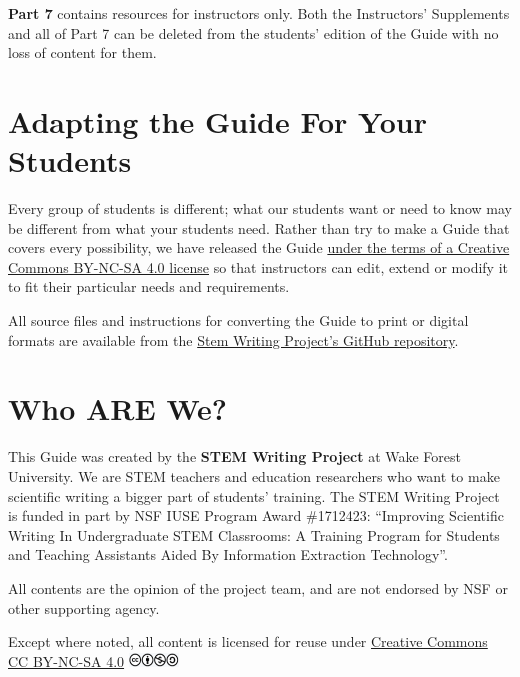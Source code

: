 \documentclass[
]{book}
\begin{document}
\textbf{Part 7} contains resources for instructors only. Both the Instructors' Supplements and all of Part 7 can be deleted from the students' edition of the Guide with no loss of content for them.

\hypertarget{adapting-the-guide-for-your-students}{%
\section*{Adapting the Guide For Your Students}\label{adapting-the-guide-for-your-students}}

Every group of students is different; what our students want or need to know may be different from what your students need. Rather than try to make a Guide that covers every possibility, we have released the Guide \href{http://creativecommons.org/licenses/by-nc-sa/4.0/}{under the terms of a Creative Commons BY-NC-SA 4.0 license} so that instructors can edit, extend or modify it to fit their particular needs and requirements.

All source files and instructions for converting the Guide to print or digital formats are available from the \href{https://github.com/adanieljohnson/SWP_student_writing_guide}{Stem Writing Project's GitHub repository}.

\hypertarget{who-are-we}{%
\section*{Who ARE We?}\label{who-are-we}}

This Guide was created by the \textbf{STEM Writing Project} at Wake Forest University. We are STEM teachers and education researchers who want to make scientific writing a bigger part of students' training. The STEM Writing Project is funded in part by NSF IUSE Program Award \#1712423: ``Improving Scientific Writing In Undergraduate STEM Classrooms: A Training Program for Students and Teaching Assistants Aided By Information Extraction Technology''.

All contents are the opinion of the project team, and are not endorsed by NSF or other supporting agency.

Except where noted, all content is licensed for reuse under \href{http://creativecommons.org/licenses/by-nc-sa/4.0/?ref=chooser-v1}{Creative Commons CC BY-NC-SA 4.0} \includegraphics[width=0.1\textwidth,height=\textheight]{images/CC_logo.png}
\end{document}
